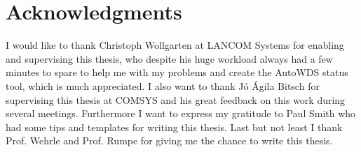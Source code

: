 \cleardoublepage

\chapter*{Acknowledgments}

I would like to thank Christoph Wollgarten at LANCOM Systems for enabling and supervising this thesis, who despite his huge workload always had a few minutes to spare
to help me with my problems and create the AutoWDS status tool, which is much appreciated.
I also want to thank J\'o \'Agila Bitsch for supervising this thesis at COMSYS and his great feedback on this work during several meetings.
Furthermore I want to express my gratitude to Paul Smith who had some tips and templates for writing this thesis.
Last but not least I thank Prof. Wehrle and Prof. Rumpe for giving me the chance to write this thesis.